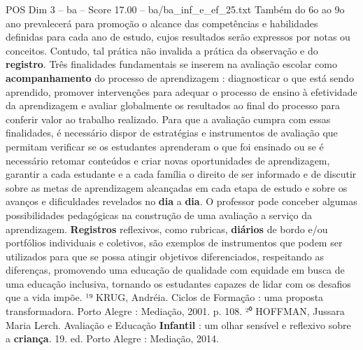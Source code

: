 \begin{textsample}{POS Dim 3 – ba – Score 17.00 – ba/ba\_inf\_e\_ef\_25.txt}
Também do 6o ao 9o ano prevalecerá para promoção o alcance das competências e habilidades definidas para cada ano de estudo, cujos resultados serão expressos por notas ou conceitos.
Contudo, tal prática não invalida a prática da observação e do \textbf{registro}.
Três finalidades fundamentais se inserem na avaliação escolar como \textbf{acompanhamento} do processo de aprendizagem : diagnosticar o que está sendo aprendido, promover intervenções para adequar o processo de ensino à efetividade da aprendizagem e avaliar globalmente os resultados ao final do processo para conferir valor ao trabalho realizado.
Para que a avaliação cumpra com essas finalidades, é necessário dispor de estratégias e instrumentos de avaliação que permitam verificar se os estudantes aprenderam o que foi ensinado ou se é necessário retomar conteúdos e criar novas oportunidades de aprendizagem, garantir a cada estudante e a cada família o direito de ser informado e de discutir sobre as metas de aprendizagem alcançadas em cada etapa de estudo e sobre os avanços e dificuldades revelados no \textbf{dia} a \textbf{dia}.
O professor pode conceber algumas possibilidades pedagógicas na construção de uma avaliação a serviço da aprendizagem. \textbf{Registros} reflexivos, como rubricas, \textbf{diários} de bordo e/ou portfólios individuais e coletivos, são exemplos de instrumentos que podem ser utilizados para que se possa atingir objetivos diferenciados, respeitando as diferenças, promovendo uma educação de qualidade com equidade em busca de uma educação inclusiva, tornando os estudantes capazes de lidar com os desafios que a vida impõe. ¹⁹ KRUG, Andréia.
Ciclos de Formação : uma proposta transformadora.
Porto Alegre : Mediação, 2001. p. 108. ²⁰ HOFFMAN, Jussara Maria Lerch.
Avaliação e Educação \textbf{Infantil} : um olhar sensível e reflexivo sobre a \textbf{criança}. 19. ed.
Porto Alegre : Mediação, 2014.

\end{textsample}
